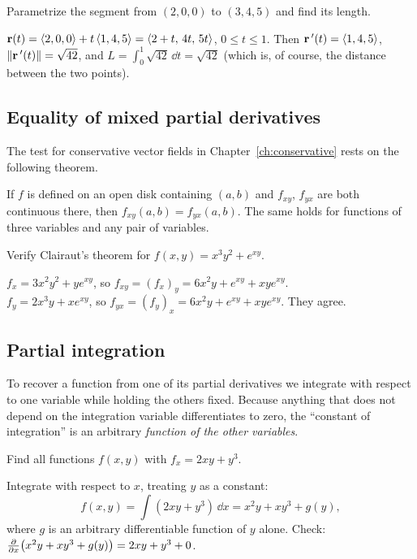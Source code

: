 \begin{example}\label{ex:prelim-seg}
Parametrize the segment from $(2,0,0)$ to $(3,4,5)$ and find its length.
\end{example}
\begin{solution}
$\mathbf{r}(t)=\left\langle 2,0,0 \right\rangle+t\left\langle 1,4,5 \right\rangle=\left\langle 2+t,\,4t,\,5t \right\rangle$, $0\le t\le1$. Then
$\mathbf{r}\,'(t)=\left\langle 1,4,5 \right\rangle$, $\lVert\mathbf{r}\,'(t)\rVert=\sqrt{42}$, and $L=\int_0^1\sqrt{42}\,\dd t=\sqrt{42}$
(which is, of course, the distance between the two points).
\end{solution}

\subsection{Equality of mixed partial derivatives}

The test for conservative vector fields in Chapter~\ref{ch:conservative} rests
on the following theorem.

\begin{theorem}[Clairaut]\label{thm:clairaut}
If $f$ is defined on an open disk containing $(a,b)$ and $f_{xy}$, $f_{yx}$ are
both continuous there, then $f_{xy}(a,b)=f_{yx}(a,b)$. The same holds for
functions of three variables and any pair of variables.
\end{theorem}

\begin{example}\label{ex:clairaut}
Verify Clairaut's theorem for $f(x,y)=x^3y^2+e^{xy}$.
\end{example}
\begin{solution}
$f_x=3x^2y^2+ye^{xy}$, so $f_{xy}=(f_x)_y=6x^2y+e^{xy}+xye^{xy}$.\\
$f_y=2x^3y+xe^{xy}$, so $f_{yx}=(f_y)_x=6x^2y+e^{xy}+xye^{xy}$. They agree.\checkok
\end{solution}

\subsection{Partial integration}

To recover a function from one of its partial derivatives we integrate with
respect to one variable while holding the others fixed. Because anything that
does not depend on the integration variable differentiates to zero, the
``constant of integration'' is an arbitrary \emph{function of the other
variables}.

\begin{example}\label{ex:partial-int}
Find all functions $f(x,y)$ with $f_x=2xy+y^3$.
\end{example}
\begin{solution}
Integrate with respect to $x$, treating $y$ as a constant:
\[
  f(x,y)=\int(2xy+y^3)\,\dd x=x^2y+xy^3+g(y),
\]
where $g$ is an arbitrary differentiable function of $y$ alone. Check:
$\frac{\partial }{\partial x}\big(x^2y+xy^3+g(y)\big)=2xy+y^3+0$.\checkok
\end{solution}

